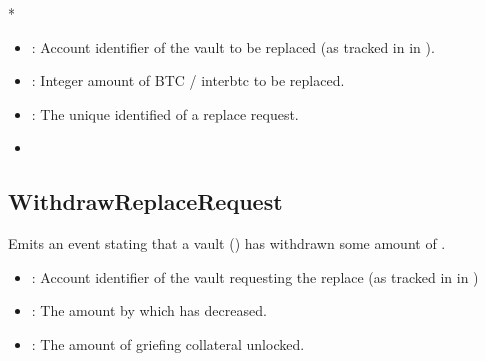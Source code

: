 \documentclass[a4paper,10pt,english]{sphinxmanual}
\begin{document}
* 

\begin{itemize}
\item {} 
: Account identifier of the vault to be replaced (as tracked in  in {\hyperref[\detokenize{spec/vault-registry:vault-registry}]{}}).

\item {} 
: Integer amount of BTC / interbtc to be replaced.

\item {} 
: The unique identified of a replace request.

\end{itemize}

\begin{itemize}
\item {} 
{\hyperref[\detokenize{spec/replace:requestreplace}]{}}

\end{itemize}


\subsection{WithdrawReplaceRequest}
\label{\detokenize{spec/replace:id14}}
Emits an event stating that a vault () has withdrawn some amount of .



\begin{itemize}
\item {} 
: Account identifier of the vault requesting the replace (as tracked in  in {\hyperref[\detokenize{spec/vault-registry:vault-registry}]{}})

\item {} 
: The amount by which  has decreased.

\item {} 
: The amount of griefing collateral unlocked.

\end{itemize}
\end{document}
